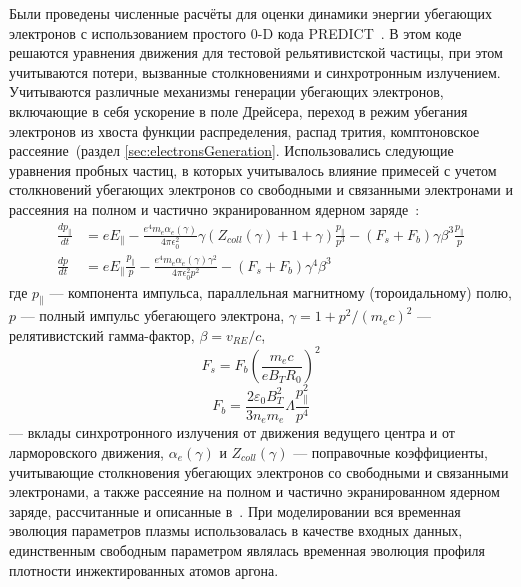 Были проведены численные расчёты для оценки динамики энергии убегающих электронов с использованием простого 0-D кода PREDICT~\cite{Pandya2019,Patel2021}. В этом коде решаются уравнения движения для тестовой рельятивистской частицы, при этом учитываются потери, вызванные столкновениями и синхротронным излучением. Учитываются различные механизмы генерации убегающих электронов, включающие в себя ускорение в поле Дрейсера, переход в режим убегания электронов из хвоста функции распределения, распад трития, комптоновское рассеяние~(раздел \ref{sec:electronsGeneration}. Использовались следующие уравнения пробных частиц, в которых учитывалось влияние примесей с учетом столкновений убегающих электронов со свободными и связанными электронами и рассеяния на полном и частично экранированном ядерном заряде~\cite{MartinSolis2017,Shevelev2021,Matsuyama2017}:
\begin{equation*}
  \begin{alignedat}{1}
    \frac{ d p_{\parallel} }{ d t } & = e E_{\parallel} - \frac{ e^4 m_e \alpha_e(\gamma) }{ 4 \pi \epsilon_0^2 } \gamma ( Z_{coll}(\gamma) + 1 + \gamma ) \frac{ p_{\parallel} }{ p^3 } - ( F_s + F_b ) \gamma \beta^3 \frac{ p_{\parallel} }{p} \\
    \frac{ d p }{ d t } & = e E_{\parallel} \frac{ p_{\parallel} }{ p } - \frac{ e^4 m_e \alpha_e(\gamma) \gamma^2 }{ 4 \pi \epsilon_0^2 p^2 } - ( F_s + F_b ) \gamma^4 \beta^3 
  \end{alignedat}  
\end{equation*}
где $ p_{\parallel} $ --- компонента импульса, параллельная магнитному (тороидальному) полю, $p$ --- полный импульс убегающего электрона, $\gamma = 1 + p^2 / ( m_e c )^2$ --- релятивистский гамма-фактор, $\beta = v_{RE}/c$, 
\begin{equation*}
  F_s = F_b \left( \frac{ m_e c }{ e B_T R_0 } \right)^2
\end{equation*}
\begin{equation*}
  F_b = \frac{ 2 \varepsilon_0 B_T^2 }{ 3 n_e m_e } \Lambda \frac{ p_{\parallel}^2 }{ p^4 } 
\end{equation*}  
--- вклады синхротронного излучения от движения ведущего центра и от ларморовского движения, $\alpha_e(\gamma)$ и $Z_{coll}(\gamma)$ --- поправочные коэффициенты, учитывающие столкновения убегающих электронов со свободными и связанными электронами, а также рассеяние на полном и частично экранированном ядерном заряде, рассчитанные и описанные в~\cite{MartinSolis2017}. При моделировании вся временная эволюция параметров плазмы использовалась в качестве входных данных, единственным свободным параметром являлась временная эволюция профиля плотности инжектированных атомов аргона.

